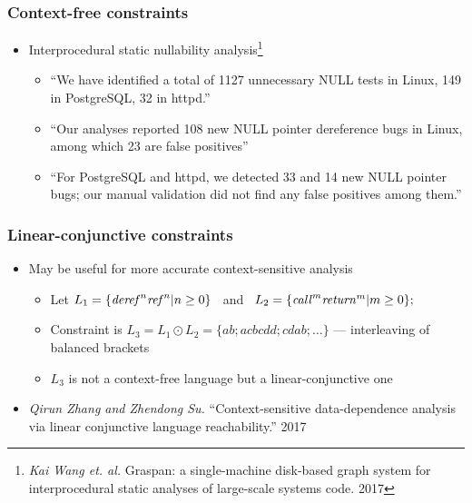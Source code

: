 \documentclass[xcolor=table,aspectratio=169]{beamer}
\begin{document}
\begin{frame}
  \transwipe[direction=90]
  \frametitle{Context-free constraints}

\begin{itemize} 
\item Interprocedural static nullability analysis\footnote{\emph{Kai Wang et. al.} Graspan: a single-machine disk-based graph system for interprocedural 
static analyses of large-scale systems code. 2017}
  
\begin{itemize} 
   \item ``We have identified a total of 1127 unnecessary NULL tests in Linux, 149 in PostgreSQL, 
   32 in httpd.''
   \item ``Our analyses reported 108 new NULL pointer dereference bugs in Linux, among which 23 are false positives''
   \item ``For PostgreSQL and httpd, we detected 33 and 14 new NULL pointer bugs; our manual 
   validation did not find any false positives among them.''
\end{itemize}

\end{itemize}

\end{frame}

\begin{frame}
  \transwipe[direction=90]
  \frametitle{Linear-conjunctive constraints}

\begin{itemize} 
  \item May be useful for more accurate context-sensitive analysis
    \begin{itemize}
      \item Let $L_1 = \{\text{\textit{deref}}^n \text{\textit{ref}}^n | n \geq 0\} $  \ and \ $ L_2 = \{\text{\textit{call}}^m \text{\textit{return}}^m | m \geq 0\};$ 
	  \item Constraint is $L_3 = L_1 \odot L_2 = \{a b; a c b c d d; c d a b;  \dots\}$ --- interleaving of balanced brackets
	  \item $L_3$ is not a context-free language but a linear-conjunctive one
    \end{itemize}

  \item \emph{Qirun Zhang and Zhendong Su.} ``Context-sensitive data-dependence analysis via linear conjunctive language reachability.'' 2017
  
\end{itemize}

\end{frame}
\end{document}
